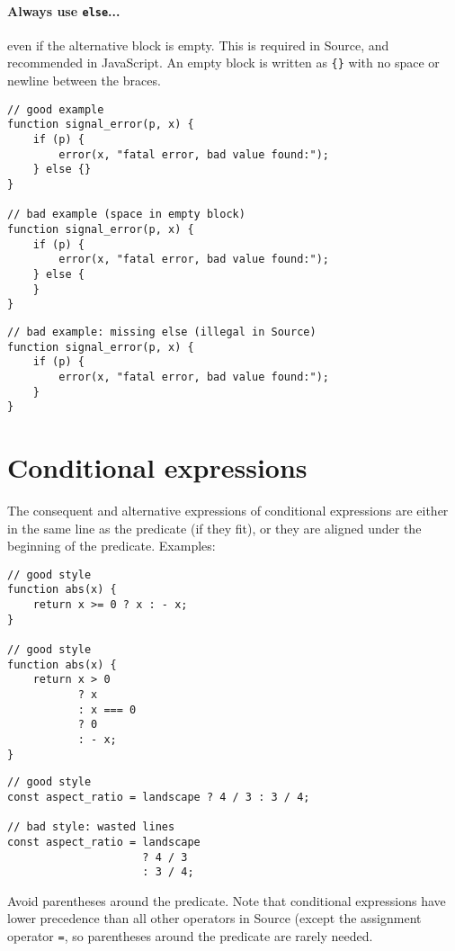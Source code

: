 \paragraph{Always use \lstinline{else}...} even if the alternative block
is empty. This is required in Source, and recommended in JavaScript.
An empty block is written as \lstinline~{}~ with no space or newline between the
braces.

\begin{lstlisting}
// good example
function signal_error(p, x) {
    if (p) {
        error(x, "fatal error, bad value found:");
    } else {}
}

// bad example (space in empty block)
function signal_error(p, x) {
    if (p) {
        error(x, "fatal error, bad value found:");
    } else {
    }
}
\end{lstlisting}
\newpage
\begin{lstlisting}
// bad example: missing else (illegal in Source)
function signal_error(p, x) {
    if (p) {
        error(x, "fatal error, bad value found:");
    }
}
\end{lstlisting}

\vspace{-4mm}

\section*{Conditional expressions}

The consequent and alternative expressions of conditional expressions are either
in the same line as the predicate (if they fit),
or they are aligned under the beginning of the predicate.
Examples:
\begin{lstlisting}
// good style
function abs(x) {
    return x >= 0 ? x : - x;
}

// good style
function abs(x) {
    return x > 0
           ? x
           : x === 0
           ? 0
           : - x;
}
\end{lstlisting}
\begin{lstlisting}
// good style
const aspect_ratio = landscape ? 4 / 3 : 3 / 4;

// bad style: wasted lines
const aspect_ratio = landscape
                     ? 4 / 3
                     : 3 / 4;
\end{lstlisting}

Avoid parentheses around the predicate. Note that conditional expressions have lower
precedence than all other operators in Source (except the assignment operator
\lstinline{=}, so parentheses around the predicate are rarely needed.

